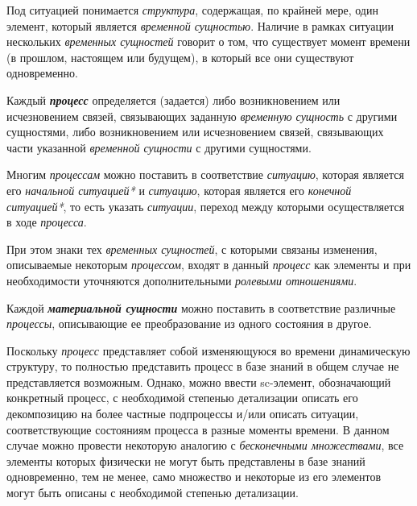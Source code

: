 \begin{SCn}
\begin{SCn}
Под ситуацией понимается \textit{структура}, содержащая, по крайней мере, один элемент, который является \textit{временной сущностью}. Наличие в рамках ситуации нескольких \textit{временных сущностей} говорит о том, что существует момент времени (в прошлом, настоящем или будущем), в который все они существуют одновременно.

\begin{SCn}
\end{SCn}

Каждый \textbf{\textit{процесс}} определяется (задается) либо возникновением или исчезновением связей, связывающих заданную \textit{временную сущность} с другими сущностями, либо возникновением или исчезновением связей, связывающих части указанной \textit{временной сущности} с другими сущностями. 
			
Многим \textit{процессам} можно поставить в соответствие \textit{ситуацию}, которая является его \textit{начальной ситуацией*} и \textit{ситуацию}, которая является его \textit{конечной ситуацией*}, то есть указать \textit{ситуации}, переход между которыми осуществляется в ходе \textit{процесса}.
			
При этом знаки тех \textit{временных сущностей}, с которыми связаны изменения, описываемые некоторым \textit{процессом}, входят в данный \textit{процесс} как элементы и при необходимости уточняются дополнительными \textit{ролевыми отношениями}.

\begin{SCn}
\begin{scnsubdividing}
\end{scnsubdividing}
\end{SCn}

Каждой \textbf{\textit{материальной сущности}} можно поставить в соответствие различные \textit{процессы}, описывающие ее преобразование из одного состояния в другое.

Поскольку \textit{процесс} представляет собой изменяющуюся во времени динамическую структуру, то полностью представить процесс в базе знаний в общем случае не представляется возможным.
Однако, можно ввести sc-элемент, обозначающий конкретный процесс, с необходимой степенью детализации описать его декомпозицию на более частные подпроцессы и/или описать ситуации, соответствующие состояниям процесса в разные моменты времени.
В данном случае можно провести некоторую аналогию с \textit{бесконечными множествами}, все элементы которых физически не могут быть представлены в базе знаний одновременно, тем не менее, само множество и некоторые из его элементов могут быть описаны с необходимой степенью детализации.
	

\end{SCn}
\end{SCn}
